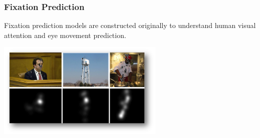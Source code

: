 \documentclass[notheorems,serif,table,compress]{beamer}  %
\begin{document}
\begin{frame}
\frametitle{Fixation Prediction}
Fixation prediction models are constructed originally to understand human visual attention and eye movement prediction.

\centering\includegraphics[width=8cm]{fixationPrediction.png}
\end{frame}
\end{document}
